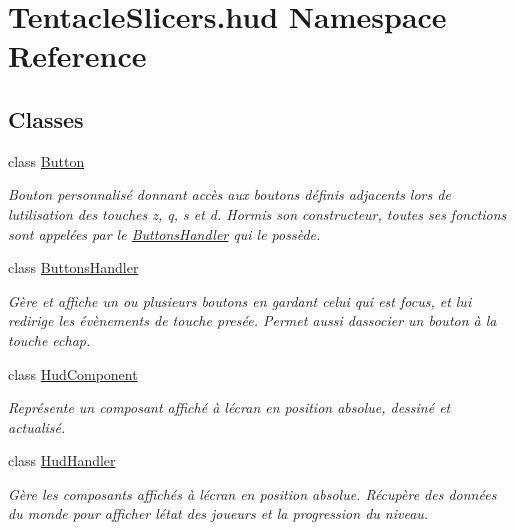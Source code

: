 \hypertarget{namespace_tentacle_slicers_1_1hud}{}\section{Tentacle\+Slicers.\+hud Namespace Reference}
\label{namespace_tentacle_slicers_1_1hud}
\subsection*{Classes}
\begin{DoxyCompactItemize}
\item 
class \hyperlink{class_tentacle_slicers_1_1hud_1_1_button}{Button}
\begin{DoxyCompactList}\small\item\em Bouton personnalisé donnant accès aux boutons définis adjacents lors de l\textquotesingle{}utilisation des touches z, q, s et d. Hormis son constructeur, toutes ses fonctions sont appelées par le \hyperlink{class_tentacle_slicers_1_1hud_1_1_buttons_handler}{Buttons\+Handler} qui le possède. \end{DoxyCompactList}\item 
class \hyperlink{class_tentacle_slicers_1_1hud_1_1_buttons_handler}{Buttons\+Handler}
\begin{DoxyCompactList}\small\item\em Gère et affiche un ou plusieurs boutons en gardant celui qui est focus, et lui redirige les évènements de touche presée. Permet aussi d\textquotesingle{}associer un bouton à la touche echap. \end{DoxyCompactList}\item 
class \hyperlink{class_tentacle_slicers_1_1hud_1_1_hud_component}{Hud\+Component}
\begin{DoxyCompactList}\small\item\em Représente un composant affiché à l\textquotesingle{}écran en position absolue, dessiné et actualisé. \end{DoxyCompactList}\item 
class \hyperlink{class_tentacle_slicers_1_1hud_1_1_hud_handler}{Hud\+Handler}
\begin{DoxyCompactList}\small\item\em Gère les composants affichés à l\textquotesingle{}écran en position absolue. Récupère des données du monde pour afficher l\textquotesingle{}état des joueurs et la progression du niveau. \end{DoxyCompactList}\item 

\end{DoxyCompactItemize}
